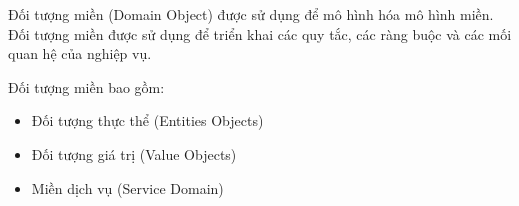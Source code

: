 Đối tượng miền (Domain Object) được sử dụng để mô hình hóa mô hình miền. Đối tượng miền được sử dụng để triển khai các quy tắc, các ràng buộc và các mối quan hệ của nghiệp vụ.

Đối tượng miền bao gồm:

\begin{itemize}

\item Đối tượng thực thể (Entities Objects)

\item Đối tượng giá trị (Value Objects)

\item Miền dịch vụ (Service Domain)

\end{itemize}